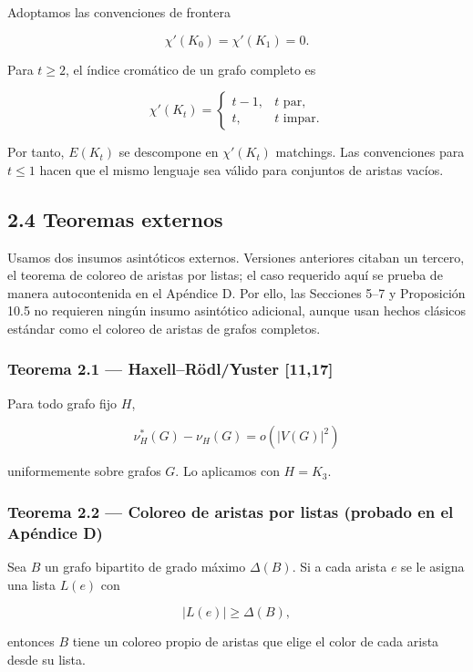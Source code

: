 \documentclass[
  11pt,
]{article}
\begin{document}
Adoptamos las convenciones de frontera

\[
\chi'(K_0)=\chi'(K_1)=0.
\]

Para \(t\ge2\), el índice cromático de un grafo completo es

\[
\chi'(K_t)
=
\begin{cases}
t-1,&t\text{ par},\\
t,&t\text{ impar}.
\end{cases}
\tag{2.2}
\]

Por tanto, \(E(K_t)\) se descompone en \(\chi'(K_t)\) matchings. Las
convenciones para \(t\le1\) hacen que el mismo lenguaje sea válido para
conjuntos de aristas vacíos.

\subsection{2.4 Teoremas externos}\label{teoremas-externos}

Usamos dos insumos asintóticos externos. Versiones anteriores citaban un
tercero, el teorema de coloreo de aristas por listas; el caso requerido
aquí se prueba de manera autocontenida en el Apéndice D. Por ello, las
Secciones 5--7 y Proposición 10.5 no requieren ningún insumo asintótico
adicional, aunque usan hechos clásicos estándar como el coloreo de
aristas de grafos completos.

\subsubsection{Teorema 2.1 --- Haxell--Rödl/Yuster
{[}11,17{]}}\label{teorema-2.1-haxellruxf6dlyuster-1117}

Para todo grafo fijo \(H\),

\[
\nu_H^*(G)-\nu_H(G)=o(|V(G)|^2)
\]

uniformemente sobre grafos \(G\). Lo aplicamos con \(H=K_3\).

\subsubsection{Teorema 2.2 --- Coloreo de aristas por listas (probado en
el Apéndice
D)}\label{teorema-2.2-coloreo-de-aristas-por-listas-probado-en-el-apuxe9ndice-d}

Sea \(B\) un grafo bipartito de grado máximo \(\Delta(B)\). Si a cada
arista \(e\) se le asigna una lista \(L(e)\) con

\[
|L(e)|\ge\Delta(B),
\]

entonces \(B\) tiene un coloreo propio de aristas que elige el color de
cada arista desde su lista.
\end{document}
